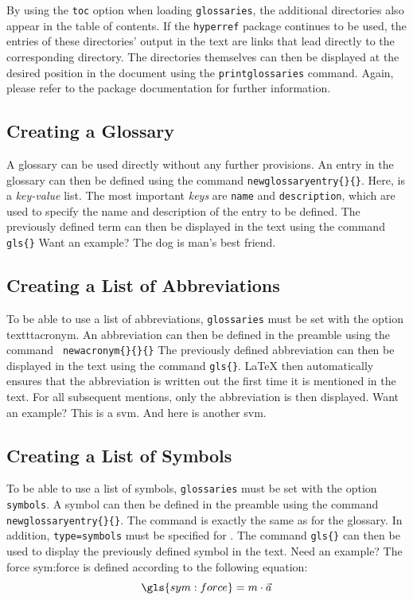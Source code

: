 By using the \texttt{toc} option when loading \texttt{glossaries}, the 
additional directories also appear in the table of contents. If the 
\texttt{hyperref} package continues to be used, the entries of these 
directories’ output in the text are links that lead directly to the 
corresponding directory. The directories themselves can then be displayed at the 
desired position in the document using the 
\texttt{\tb printglossaries} command. Again, please refer to the package 
documentation for further information.

\subsection{Creating a Glossary}
A glossary can be used directly without any further provisions. An entry in the 
glossary can then be defined using the command
\texttt{\tb newglossaryentry\{\}\{\}}.
Here,  is a \emph{key-value} list.
The most important \emph{keys} are \texttt{name} and \texttt{description}, which 
are used to specify the name and description of the entry to be defined. The 
previously defined term can then be displayed in the text using the command  
\texttt{\tb gls\{\}} Want an example? The
\gls{dog} is man's best friend.


\subsection{Creating a List of Abbreviations}
To be able to use a list of abbreviations, \texttt{glossaries} must be set with 
the option texttt{acronym}. An abbreviation can then be defined in the preamble 
using the command \texttt{\tb 
newacronym\{\}\{\}\{\}}  
The previously defined abbreviation can then be displayed in the text using the 
command \texttt{\tb gls\{\}}. \LaTeX{} then automatically ensures 
that the abbreviation is written out the first time it is mentioned in the text. 
For all subsequent mentions, only the abbreviation is then displayed. Want an 
example? This is a \gls{svm}. And here is another \gls{svm}. 

\subsection{Creating a List of Symbols}
To be able to use a list of symbols, \texttt{glossaries} must be set with the 
option \texttt{symbols}. A symbol can then be defined in the preamble using the command
\texttt{\tb newglossaryentry\{\}\{\}}.
The command is exactly the same as for the glossary. In addition, 
\texttt{type=symbols} must be specified for .
The command \texttt{\tb gls\{\}} can then be used to display the 
previously defined symbol in the text. Need an example? The force  
\gls{sym:force} is defined according to the following equation:
\begin{equation*}
	\gls{sym:force}=m\cdot \vec{a}
\end{equation*}


